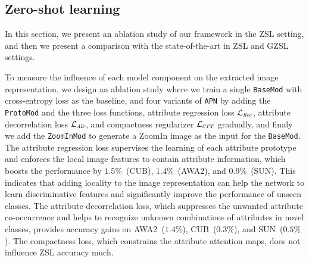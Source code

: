 \subsection{Zero-shot learning}
In this section, we present an ablation study of our framework in the ZSL setting, and then we present a comparison with the state-of-the-art in ZSL and GZSL settings.

 To measure the influence of each model component on the extracted image representation, we design an ablation study where we train a single \texttt{BaseMod} with cross-entropy loss as the baseline, and four variants of \texttt{APN} by adding the \texttt{ProtoMod} and the three loss functions, attribute regression loss $\mathcal{L}_{\Scale[0.6]{Reg}}$, attribute decorrelation loss $\mathcal{L}_{\Scale[0.6]{AD}}$, and compactness regularizer $\mathcal{L}_{\Scale[0.6]{CPT}}$ gradually, and finaly we add the \texttt{ZoomInMod} to generate a ZoomIn image as the input for the \texttt{BaseMod}. 
The attribute regression loss supervises the learning of each attribute prototype and enforces the local image features to contain attribute information, which boosts the performance by $1.5\%$~(CUB), $1.4\%$~(AWA2), and $0.9\%$~(SUN). This indicates that adding locality to the image representation can help the network to learn discriminative features and significantly improve the performance of unseen classes. The attribute decorrelation loss, which suppresses the unwanted attribute co-occurrence and helps to recognize unknown combinations of attributes in novel classes, provides accuracy gains on AWA2~($1.4\%$), CUB~($0.3\%$), and SUN~($0.5\%$). The compactness loss, which constrains the attribute attention maps, does not influence ZSL accuracy much. 




